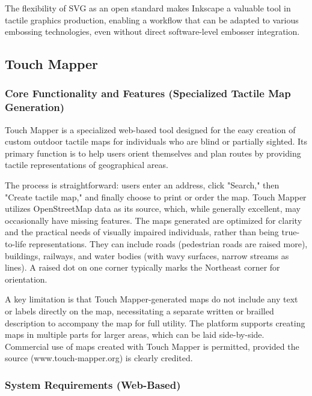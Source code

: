 The flexibility of SVG as an open standard makes Inkscape a valuable tool in tactile graphics production, enabling a workflow that can be adapted to various embossing technologies, even without direct software-level embosser integration.\cite{ProBlindCreate}

\subsection{Touch Mapper}

\subsubsection{Core Functionality and Features (Specialized Tactile Map Generation)}

Touch Mapper is a specialized web-based tool designed for the easy creation of custom outdoor tactile maps for individuals who are blind or partially sighted.\cite{AELData,NYUWorkflow,Ability2AccessTSS} Its primary function is to help users orient themselves and plan routes by providing tactile representations of geographical areas.\cite{AELData,NYUWorkflow}

The process is straightforward: users enter an address, click "Search," then "Create tactile map," and finally choose to print or order the map.\cite{NYUWorkflow} Touch Mapper utilizes OpenStreetMap data as its source, which, while generally excellent, may occasionally have missing features.\cite{AELData} The maps generated are optimized for clarity and the practical needs of visually impaired individuals, rather than being true-to-life representations.\cite{AELData} They can include roads (pedestrian roads are raised more), buildings, railways, and water bodies (with wavy surfaces, narrow streams as lines).\cite{AELData} A raised dot on one corner typically marks the Northeast corner for orientation.\cite{AELData,Ability2AccessTSS}

A key limitation is that Touch Mapper-generated maps do not include any text or labels directly on the map, necessitating a separate written or brailled description to accompany the map for full utility.\cite{AELData,Ability2AccessTSS} The platform supports creating maps in multiple parts for larger areas, which can be laid side-by-side.\cite{AELData} Commercial use of maps created with Touch Mapper is permitted, provided the source (www.touch-mapper.org) is clearly credited.\cite{AELData}

\subsubsection{System Requirements (Web-Based)}

